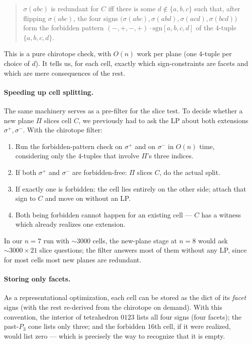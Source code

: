\documentclass[11pt]{article}
\begin{document}
\begin{quote}
$\sigma(abc)$ is redundant for $C$ iff there is some $d \notin \{a,b,c\}$
such that, after flipping $\sigma(abc)$, the four signs
$\bigl(\sigma(abc),\sigma(abd),\sigma(acd),\sigma(bcd)\bigr)$ form the
forbidden pattern $(-,+,-,+)\cdot\mathrm{sgn}[a,b,c,d]$ of the $4$-tuple
$\{a,b,c,d\}$.
\end{quote}

This is a pure chirotope check, with $O(n)$ work per plane (one
$4$-tuple per choice of $d$). It tells us, for each cell, exactly which
sign-constraints are facets and which are mere consequences of the rest.

\paragraph{Speeding up cell splitting.} The same machinery serves as a
pre-filter for the slice test. To decide whether a new plane $\Pi$ slices
cell $C$, we previously had to ask the LP about both extensions $\sigma^+,
\sigma^-$. With the chirotope filter:

\begin{enumerate}
  \item Run the forbidden-pattern check on $\sigma^+$ and on $\sigma^-$ in
  $O(n)$ time, considering only the $4$-tuples that involve $\Pi$'s three
  indices.
  \item If both $\sigma^+$ and $\sigma^-$ are forbidden-free: $\Pi$ slices
  $C$, do the actual split.
  \item If exactly one is forbidden: the cell lies entirely on the other
  side; attach that sign to $C$ and move on without an LP.
  \item Both being forbidden cannot happen for an existing cell --- $C$
  has a witness which already realizes one extension.
\end{enumerate}

In our $n=7$ run with $\sim\!3000$ cells, the new-plane stage at $n=8$ would
ask $\sim\!3000\times 21$ slice questions; the filter answers most of them
without any LP, since for most cells most new planes are redundant.

\paragraph{Storing only facets.} As a representational optimization, each
cell can be stored as the dict of its \emph{facet} signs (with the rest
re-derived from the chirotope on demand). With this convention, the
interior of tetrahedron $0123$ lists all four signs (four facets); the
past-$P_3$ cone lists only three; and the forbidden $16$th cell, if it were
realized, would list zero --- which is precisely the way to recognize that
it is empty.
\end{document}
